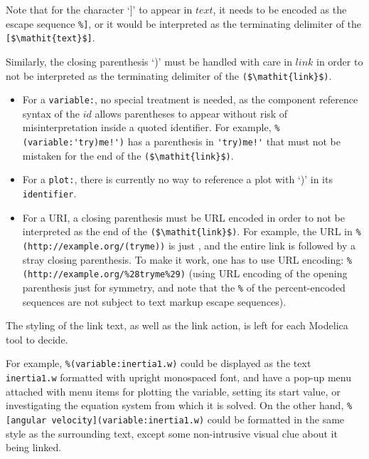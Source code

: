 \begin{nonnormative}
Note that for the character `]' to appear in $\mathit{text}$, it needs to be encoded as the escape sequence \lstinline!%]!, or it would be interpreted as the terminating delimiter of the \lstinline![$\mathit{text}$]!.

Similarly, the closing parenthesis `)' must be handled with care in $\mathit{link}$ in order to not be interpreted as the terminating delimiter of the \lstinline!($\mathit{link}$)!.
\begin{itemize}
\item
For a \lstinline!variable:!, no special treatment is needed, as the component reference syntax of the $\mathit{id}$ allows parentheses to appear without risk of misinterpretation inside a quoted identifier.
For example, \lstinline"%(variable:'try)me!')" has a parenthesis in \lstinline"'try)me!'" that must not be mistaken for the end of the \lstinline!($\mathit{link}$)!.
\item
For a \lstinline!plot:!, there is currently no way to reference a plot with `)' in its \lstinline!identifier!.
\item
For a URI, a closing parenthesis must be URL encoded in order to not be interpreted as the end of the \lstinline!($\mathit{link}$)!.
For example, the URL in \lstinline[language={[nocomment]modelica}]!%
To make it work, one has to use URL encoding: \lstinline[language={[nocomment]modelica}]!%
\end{itemize}
\end{nonnormative}

The styling of the link text, as well as the link action, is left for each Modelica tool to decide.

\begin{nonnormative}
For example, \lstinline!%(variable:inertia1.w)! could be displayed as the text \lstinline!inertia1.w! formatted with upright monospaced font, and have a pop-up menu attached with menu items for plotting the variable, setting its start value, or investigating the equation system from which it is solved.
On the other hand, \lstinline!%[angular velocity](variable:inertia1.w)! could be formatted in the same style as the surrounding text, except some non-intrusive visual clue about it being linked.
\end{nonnormative}

